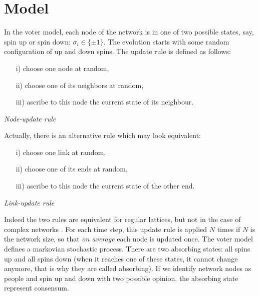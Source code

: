 \section{Model}
In the voter model, each node of the network is in one of two possible states, say, spin up or spin down: $\sigma_i \in \{\pm 1\}$. The evolution starts with some random configuration of up and down spins. The update rule is defined as follows: 
\medskip
\newline
\begin{minipage}{0.8\textwidth}
\begin{itemize}
    \item[i)] choose one node at random,
    \item[ii)] choose one of its neighbors at random,
    \item[iii)] ascribe to this node the current state of its neighbour.
\end{itemize}
\end{minipage}
\hfill
\begin{minipage}{0.2\textwidth}
\vfill
    \textit{Node-update rule}
\vfill
\end{minipage}
\medskip
\newline
Actually, there is an alternative rule which may look equivalent:
\medskip
\newline
\begin{minipage}{0.8\textwidth}
\begin{itemize}
    \item[i)] choose one link at random,
    \item[ii)] choose one of its ends at random,
    \item[iii)] ascribe to this node the current state of the other end.
\end{itemize}
\end{minipage}
\hfill
\begin{minipage}{0.2\textwidth}
\vfill
    \textit{Link-update rule}
\vfill
\end{minipage}
\medskip
\newline
Indeed the two rules are equivalent for regular lattices, but not in the case of complex networks \cite{suchecki_analitical}. For each time step, this update rule is applied $N$ times if $N$ is the network size, so that \textit{on average} each node is updated once. The voter model defines a markovian stochastic process. There are two absorbing states: all spins up and all spins down (when it reaches one of these states, it cannot change anymore, that is why they are called absorbing). If we identify network nodes as people and spin up and down with two possible opinion, the absorbing state represent consensum. \\
